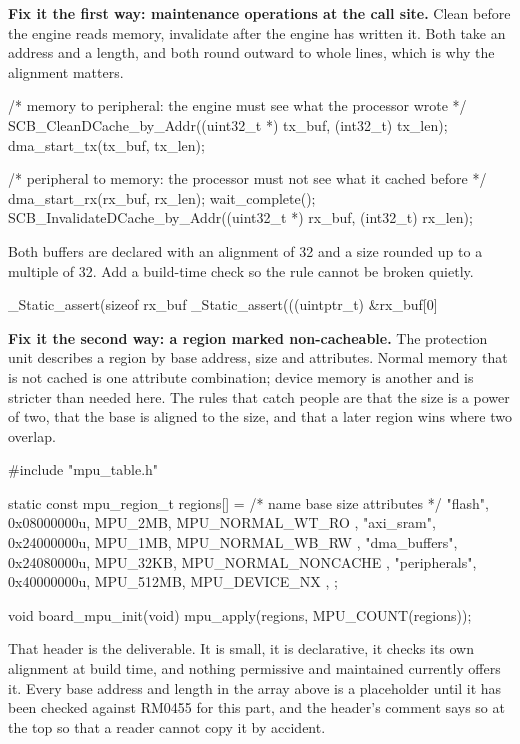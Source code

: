 \begin{steps}
\item \textbf{Fix it the first way: maintenance operations at the call site.}
Clean before the engine reads memory, invalidate after the engine has written
it. Both take an address and a length, and both round outward to whole lines,
which is why the alignment matters.
\begin{ccode}
/* memory to peripheral: the engine must see what the processor wrote */
SCB_CleanDCache_by_Addr((uint32_t *) tx_buf, (int32_t) tx_len);
dma_start_tx(tx_buf, tx_len);

/* peripheral to memory: the processor must not see what it cached before */
dma_start_rx(rx_buf, rx_len);
wait_complete();
SCB_InvalidateDCache_by_Addr((uint32_t *) rx_buf, (int32_t) rx_len);
\end{ccode}
Both buffers are declared with an alignment of 32 and a size rounded up to a
multiple of 32. Add a build-time check so the rule cannot be broken quietly.
\begin{ccode}
_Static_assert(sizeof rx_buf %
_Static_assert(((uintptr_t) &rx_buf[0] %
\end{ccode}

\item \textbf{Fix it the second way: a region marked non-cacheable.} The
protection unit describes a region by base address, size and attributes. Normal
memory that is not cached is one attribute combination; device memory is
another and is stricter than needed here. The rules that catch people are that
the size is a power of two, that the base is aligned to the size, and that a
later region wins where two overlap.
\begin{ccode}
#include "mpu_table.h"

static const mpu_region_t regions[] = {
  /* name             base          size        attributes            */
  { "flash",          0x08000000u,  MPU_2MB,    MPU_NORMAL_WT_RO      },
  { "axi_sram",       0x24000000u,  MPU_1MB,    MPU_NORMAL_WB_RW      },
  { "dma_buffers",    0x24080000u,  MPU_32KB,   MPU_NORMAL_NONCACHE   },
  { "peripherals",    0x40000000u,  MPU_512MB,  MPU_DEVICE_NX         },
};

void board_mpu_init(void) { mpu_apply(regions, MPU_COUNT(regions)); }
\end{ccode}
That header is the deliverable. It is small, it is declarative, it checks its
own alignment at build time, and nothing permissive and maintained currently
offers it. Every base address and length in the array above is a placeholder
until it has been checked against RM0455 for this part, and the header's
comment says so at the top so that a reader cannot copy it by accident.


\end{steps}
